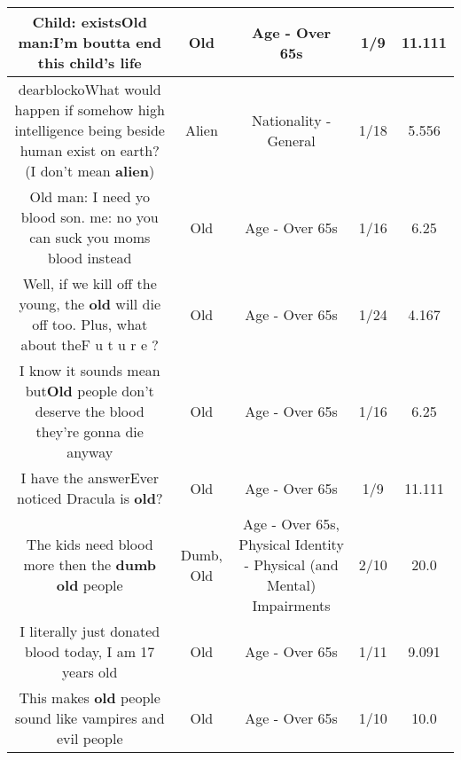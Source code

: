 \documentclass[11pt]{article}
\newlength\mylength
\begin{document}
\begin{center}
\begin{longtable}{|C{.65\mylength}|C{.30\mylength}|C{.12\mylength}|C{.12\mylength}|C{.12\mylength}|}
  \small Child: exists\textbf{Old} man:I'm boutta end this child's life\normalsize   & Old & Age - Over 65s & 1/9 & 11.111 \\  \hline
  \small dearblockoWhat would happen if somehow high intelligence being beside human exist on earth? (I don't mean \textbf{alien})\normalsize   & Alien & Nationality - General & 1/18 & 5.556 \\  \hline
  \small Old man: I need yo blood son.  me: no you can suck you moms blood instead\normalsize   & Old & Age - Over 65s & 1/16 & 6.25 \\  \hline
  \small Well, if we kill off the young, the \textbf{old} will die off too. Plus,  what about theF u t u r e ?\normalsize   & Old & Age - Over 65s & 1/24 & 4.167 \\  \hline
  \small I know it sounds mean but\textbf{Old} people don't deserve the blood they're gonna die anyway\normalsize   & Old & Age - Over 65s & 1/16 & 6.25 \\  \hline
  \small I have the answerEver noticed Dracula is \textbf{old}?\normalsize   & Old & Age - Over 65s & 1/9 & 11.111 \\  \hline
  \small The kids need blood more then the \textbf{dumb} \textbf{old} people\normalsize   & Dumb, Old & Age - Over 65s, Physical Identity - Physical (and Mental) Impairments & 2/10 & 20.0 \\  \hline
  \small I literally just donated blood today, I am 17 years old\normalsize   & Old & Age - Over 65s & 1/11 & 9.091 \\  \hline
  \small This makes \textbf{old} people sound like vampires and evil people\normalsize   & Old & Age - Over 65s & 1/10 & 10.0 \\  \hline

\end{longtable}
\end{center}
\end{document}
